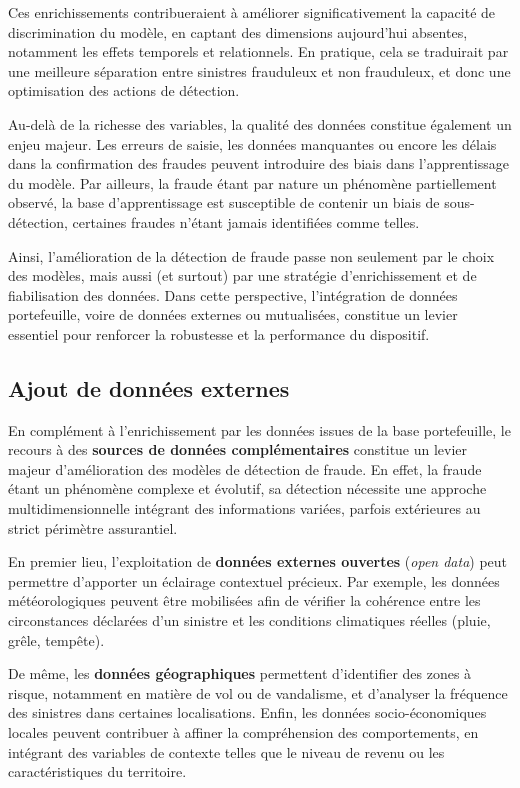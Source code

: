 Ces enrichissements contribueraient à améliorer significativement la capacité de discrimination du modèle, en captant des dimensions aujourd'hui absentes, notamment les effets temporels et relationnels. En pratique, cela se traduirait par une meilleure séparation entre sinistres frauduleux et non frauduleux, et donc une optimisation des actions de détection.

Au-delà de la richesse des variables, la qualité des données constitue également un enjeu majeur. Les erreurs de saisie, les données manquantes ou encore les délais dans la confirmation des fraudes peuvent introduire des biais dans l'apprentissage du modèle. Par ailleurs, la fraude étant par nature un phénomène partiellement observé, la base d'apprentissage est susceptible de contenir un biais de sous-détection, certaines fraudes n'étant jamais identifiées comme telles.

Ainsi, l'amélioration de la détection de fraude passe non seulement par le choix des modèles, mais aussi (et surtout) par une stratégie d'enrichissement et de fiabilisation des données. Dans cette perspective, l'intégration de données portefeuille, voire de données externes ou mutualisées, constitue un levier essentiel pour renforcer la robustesse et la performance du dispositif.

\subsection{Ajout de données externes}

En complément à l'enrichissement par les données issues de la base portefeuille, le recours à des \textbf{sources de données complémentaires} constitue un levier majeur d'amélioration des modèles de détection de fraude. En effet, la fraude étant un phénomène complexe et évolutif, sa détection nécessite une approche multidimensionnelle intégrant des informations variées, parfois extérieures au strict périmètre assurantiel.

En premier lieu, l'exploitation de \textbf{données externes ouvertes} (\textit{open data}) peut permettre d'apporter un éclairage contextuel précieux. Par exemple, les données météorologiques peuvent être mobilisées afin de vérifier la cohérence entre les circonstances déclarées d'un sinistre et les conditions climatiques réelles (pluie, grêle, tempête).

De même, les \textbf{données géographiques} permettent d'identifier des zones à risque, notamment en matière de vol ou de vandalisme, et d'analyser la fréquence des sinistres dans certaines localisations. Enfin, les données socio-économiques locales peuvent contribuer à affiner la compréhension des comportements, en intégrant des variables de contexte telles que le niveau de revenu ou les caractéristiques du territoire.

